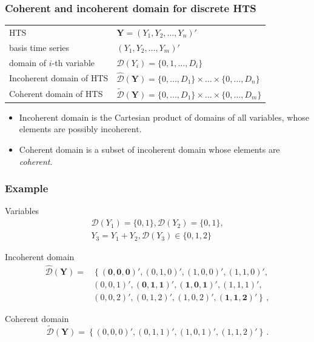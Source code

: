 \documentclass[12pt]{beamer}
\begin{document}
\begin{frame}
\frametitle{Coherent and incoherent domain for discrete HTS}
\begin{table}
    \fontsize{9}{10.2}\selectfont
\begin{tabular}{ll}
    \toprule
    HTS & $\mathbf{Y}=(Y_1,Y_2,\dots,Y_n)'$ \\
    basis time series & $(Y_1,Y_2,\dots,Y_{m})'$ \\
    domain of $i$-th variable & $\mathcal{D}(Y_i) = \{0,1,\dots,D_i\}$ \\
    Incoherent domain of HTS & $\hat{\mathcal{D}}(\mathbf{Y}) = \{0,\dots,D_1\}\times \dots\times \{0,\dots,D_n\}$ \\
    Coherent domain of HTS & $\tilde{\mathcal{D}}(\mathbf{Y}) = \{0,\dots,D_1\}\times \dots\times\{0,\dots,D_m\}$ \\\bottomrule
\end{tabular}
\end{table}

\begin{itemize}
    \item Incoherent domain is the Cartesian product of domains of all variables, whose elements are possibly incoherent.
    \item Coherent domain is a subset of incoherent domain whose elements are \textit{coherent}.
\end{itemize}

\end{frame}


\begin{frame}
\frametitle{Example}
\begin{block}{Variables}
\[
\begin{aligned}
  \mathcal{D}(Y_1) = \{0, 1\}, \mathcal{D}(Y_2) = \{0, 1\}, \\
  Y_3=Y_1+Y_2, \mathcal{D}(Y_3)\in\{0,1,2\}
\end{aligned}
\]
\end{block}


\begin{block}{Incoherent domain}
\[
\begin{aligned}
\hat{\mathcal D}(\mathbf{Y})=&\left\{\mathbf{(0,0,0)'},(0,1,0)',(1,0,0)',(1,1,0)',\right.\\
&\left.(0,0,1)',\mathbf{(0,1,1)'},\mathbf{(1,0,1)'},(1,1,1)',\right.\\
&\left.(0,0,2)',(0,1,2)',(1,0,2)',\mathbf{(1,1,2)'}\right\}\,,
\end{aligned}
\]
\end{block}


\begin{block}{Coherent domain}
\[
    \tilde{\mathcal D}(\mathbf{Y})=\left\{(0,0,0)',(0,1,1)',(1,0,1)',(1,1,2)'\right\}\,.
\]    
    
\end{block}
\end{frame}
\end{document}
